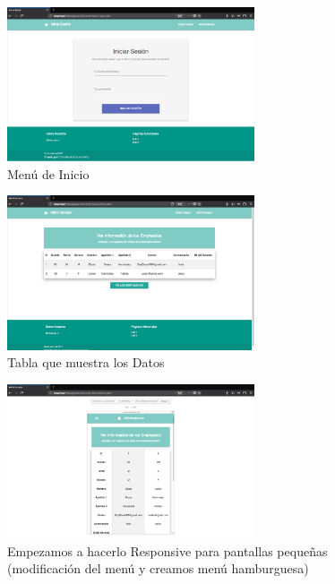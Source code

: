 \documentclass[12pt, fleqn]{report}                             %
\begin{document}
        \begin{figure}[ht]
            \centering
            \includegraphics[width=0.65\textwidth]{EjemploInterfazSegundaParte2}
            \caption{Menú de Inicio}
        \end{figure}

        \begin{figure}[ht]
            \centering
            \includegraphics[width=0.65\textwidth]{EjemploInterfazSegundaParte3}
            \caption{Tabla que muestra los Datos}
        \end{figure}

        \begin{figure}[ht]
            \centering
            \includegraphics[width=0.65\textwidth]{EjemploInterfazSegundaParte4}
            \caption{Empezamos a hacerlo Responsive para pantallas pequeñas (modificación del menú y creamos menú hamburguesa)}
        \end{figure}
\end{document}
